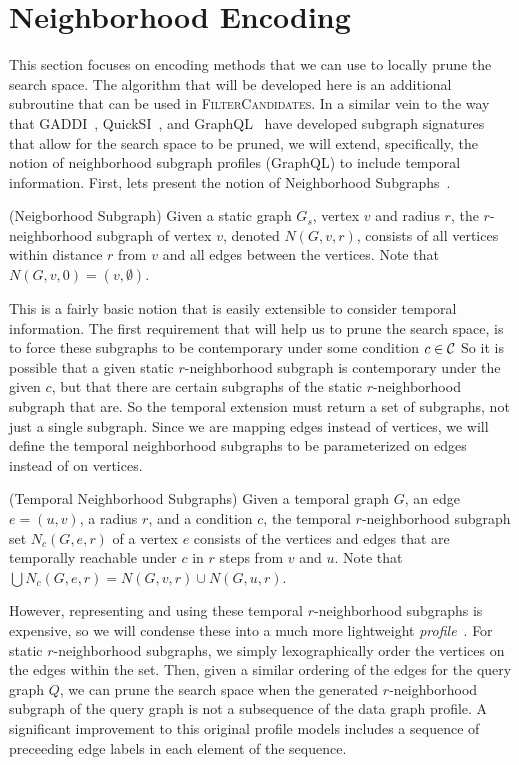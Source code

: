 \section{Neighborhood Encoding}
\label{sec:encoding}

This section focuses on encoding methods that we can use to locally prune the
search space. The algorithm that will be developed here is an additional
subroutine that can be used in \textsc{FilterCandidates}. In a similar vein to
the way that GADDI~\cite{2009-EDBT-GADDI}, QuickSI~\cite{2008-VLDB-QuickSI}, and
GraphQL~\cite{2008-SIGMOD-GraphQL} have developed subgraph signatures that allow
for the search space to be pruned, we will extend, specifically, the notion of
neighborhood subgraph profiles (GraphQL) to include temporal information. First,
lets present the notion of Neighborhood Subgraphs~\cite{2008-SIGMOD-GraphQL}.

\begin{defn}
  (Neigborhood Subgraph) Given a static graph $G_s$, vertex $v$ and radius $r$,
  the $r$-neighborhood subgraph of vertex $v$, denoted $N(G,v,r)$, consists of
  all vertices within distance $r$ from $v$ and all edges between the
  vertices. Note that $N(G,v,0) = ({v}, \emptyset)$.
\end{defn}

This is a fairly basic notion that is easily extensible to consider temporal
information. The first requirement that will help us to prune the search space,
is to force these subgraphs to be contemporary under some condition $c \in \mathcal{C}$
So it is possible that a given static $r$-neighborhood subgraph is contemporary
under the given $c$, but that there are certain subgraphs of the static
$r$-neighborhood subgraph that are.  So the temporal extension must return a set
of subgraphs, not just a single subgraph. Since we are mapping edges instead of
vertices, we will define the temporal neighborhood subgraphs to be parameterized
on edges instead of on vertices.

\begin{defn}
  (Temporal Neighborhood Subgraphs) Given a temporal graph $G$, an edge $e =
  (u,v)$, a radius $r$, and a condition $c$, the temporal $r$-neighborhood
  subgraph set $N_c(G,e,r)$ of a vertex $e$ consists of the vertices and edges
  that are temporally reachable under $c$ in $r$ steps from $v$ and $u$. Note
  that $\displaystyle\bigcup N_c(G,e,r) = N(G,v,r) \cup N(G,u,r)$.
\end{defn}

However, representing and using these temporal $r$-neighborhood subgraphs is
expensive, so we will condense these into a much more lightweight
\textit{profile}~\cite{2008-SIGMOD-GraphQL}. For static $r$-neighborhood
subgraphs, we simply lexographically order the vertices on the edges within the
set. Then, given a similar ordering of the edges for the query graph $Q$, we
can prune the search space when the generated $r$-neighborhood subgraph of the
query graph is not a subsequence of the data graph profile. A significant
improvement to this original profile models \cite{2012-VDLP-IsoSurvey} includes
a sequence of preceeding edge labels in each element of the sequence. 

